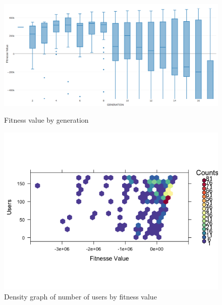\documentclass{bmcart}
\begin{document}
\begin{backmatter}
\begin{figure}[h!]
\begin{minipage}{.5\textwidth}
\centering
\includegraphics{./images/experiment1-5.png}
\caption{Fitness value by generation}
\label{fig:summaryboxplot1}
\end{minipage}
\begin{minipage}{.5\textwidth}
\centering
\includegraphics{./images/experiment1-6.png}
\caption{Density graph of number of users by fitness value}
\label{fig:density1}
\end{minipage}
\end{figure}


\end{backmatter}
\end{document}
